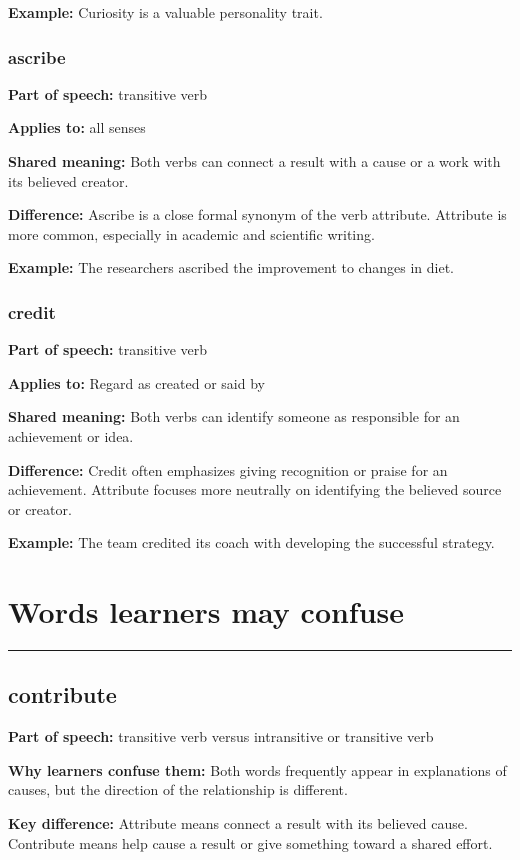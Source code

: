 \documentclass[11pt]{article}
\newcommand{\sectionrule}{\par\vspace{-0.5em}\noindent\textcolor{Accent}{\rule{\linewidth}{0.6pt}}\par}
\begin{document}
\textbf{Example:} Curiosity is a valuable personality trait.

\subsubsection{ascribe}
\textbf{Part of speech:} transitive verb

\textbf{Applies to:} all senses

\textbf{Shared meaning:} Both verbs can connect a result with a cause or a work with its believed creator.

\textbf{Difference:} Ascribe is a close formal synonym of the verb attribute. Attribute is more common, especially in academic and scientific writing.

\textbf{Example:} The researchers ascribed the improvement to changes in diet.

\subsubsection{credit}
\textbf{Part of speech:} transitive verb

\textbf{Applies to:} Regard as created or said by

\textbf{Shared meaning:} Both verbs can identify someone as responsible for an achievement or idea.

\textbf{Difference:} Credit often emphasizes giving recognition or praise for an achievement. Attribute focuses more neutrally on identifying the believed source or creator.

\textbf{Example:} The team credited its coach with developing the successful strategy.

\section{Words learners may confuse}
\sectionrule
\subsection{contribute}
\textbf{Part of speech:} transitive verb versus intransitive or transitive verb

\textbf{Why learners confuse them:} Both words frequently appear in explanations of causes, but the direction of the relationship is different.

\textbf{Key difference:} Attribute means connect a result with its believed cause. Contribute means help cause a result or give something toward a shared effort.
\end{document}

